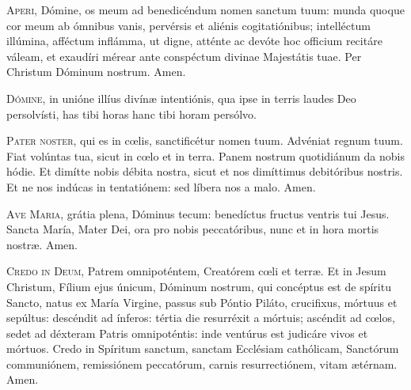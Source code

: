 \documentclass[nocturnale-dominicis.tex]{subfiles}
\begin{document}

\begin{multicols}{2}
\lettrine{A}{peri}, Dómine, os meum ad benedicéndum nomen sanctum tuum: munda quoque cor meum ab ómnibus vanis, pervérsis et aliénis 
cogitatiónibus; intelléctum illúmina, afféctum inflámma, ut digne, atténte ac devóte hoc officium recitáre váleam, et exaudíri mérear
ante conspéctum divinae Majestátis tuae. Per Christum Dóminum nostrum. Amen.

\lettrine{D}{ómine}, in unióne illíus divínæ intentiónis, qua ipse in terris laudes Deo persolvísti, has tibi horas  hanc tibi horam\rubric{)} persólvo.

\lettrine{P}{ater noster}, qui es in cœlis, sanctificétur nomen tuum. Advéniat regnum tuum. Fiat volúntas tua, sicut in cœlo et in terra.
Panem nostrum quotidiánum da nobis hódie. Et dimítte nobis débita nostra, sicut et nos dimíttimus debitóribus nostris. Et ne nos
indúcas in tentatiónem: sed líbera nos a malo. Amen.

\lettrine{A}{ve Maria}, grátia plena, Dóminus tecum: benedíctus fructus ventris tui Jesus. Sancta María, Mater Dei, ora pro nobis 
peccatóribus, nunc et in hora mortis nostræ. Amen.

\lettrine{C}{redo in Deum}, Patrem omnipoténtem, Creatórem cœli et terræ. Et in Jesum Christum, Fílium ejus únicum, Dóminum nostrum,
qui concéptus est de spíritu Sancto, natus ex María Virgine, passus sub Póntio Piláto, crucifixus, mórtuus et sepúltus: descéndit
ad ínferos: tértia die resurréxit a mórtuis; ascéndit ad cœlos, sedet ad déxteram Patris omnipoténtis: inde ventúrus est judicáre
vivos et mórtuos. Credo in Spíritum sanctum, sanctam Ecclésiam cathólicam, Sanctórum communiónem, remissiónem peccatórum,
carnis resurrectiónem, vitam ætérnam. Amen.
\end{multicols}




\end{document}
